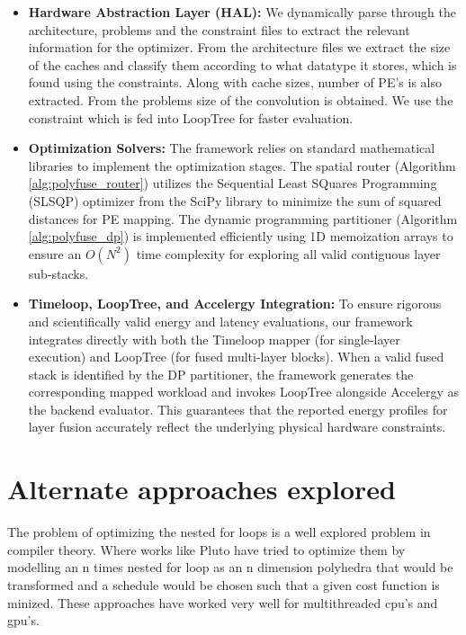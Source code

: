 \documentclass[conference]{IEEEtran}
\begin{document}
\begin{itemize}
    \item \textbf{Hardware Abstraction Layer (HAL):} We dynamically parse through the architecture, problems and the constraint files to extract the relevant information for the optimizer. From the architecture files we extract the size of the caches and classify them according to what datatype it stores, which is found using the constraints. Along with cache sizes, number of PE's is also extracted. From the problems size of the convolution is obtained. We use the constraint which is fed into LoopTree for faster evaluation.
    
    \item \textbf{Optimization Solvers:} The framework relies on standard mathematical libraries to implement the optimization stages. The spatial router (Algorithm \ref{alg:polyfuse_router}) utilizes the Sequential Least SQuares Programming (SLSQP) optimizer from the SciPy library to minimize the sum of squared distances for PE mapping. The dynamic programming partitioner (Algorithm \ref{alg:polyfuse_dp}) is implemented efficiently using 1D memoization arrays to ensure an $O(N^2)$ time complexity for exploring all valid contiguous layer sub-stacks.
    
    \item \textbf{Timeloop, LoopTree, and Accelergy Integration:} To ensure rigorous and scientifically valid energy and latency evaluations, our framework integrates directly with both the Timeloop mapper (for single-layer execution) and LoopTree (for fused multi-layer blocks). When a valid fused stack is identified by the DP partitioner, the framework generates the corresponding mapped workload and invokes LoopTree alongside Accelergy as the backend evaluator. This guarantees that the reported energy profiles for layer fusion accurately reflect the underlying physical hardware constraints.

\end{itemize}

\section{Alternate approaches explored}

The problem of optimizing the nested for loops is a well explored problem in compiler theory. Where works like Pluto have tried to optimize them by modelling an n times nested for loop as an n dimension polyhedra that would be transformed and a schedule would be chosen such that a given cost function is minized. These approaches have worked very well for multithreaded cpu's and gpu's.
\end{document}
